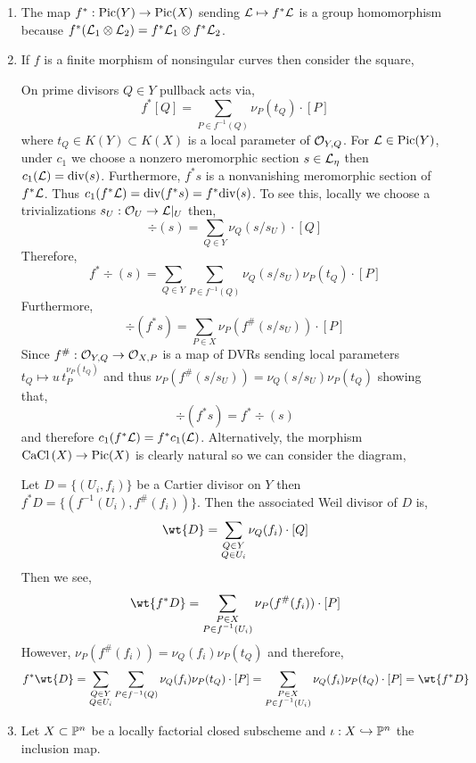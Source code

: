 \documentclass[12pt]{article}
\begin{document}
\begin{enumerate}
\item The map $f^* : \Pic{Y} \to \Pic{X}$ sending $\L \mapsto f^* \L$ is a group homomorphism because $f^* (\L_1 \otimes \L_2) = f^* \L_1 \otimes f^* \L_2$. 

\item If $f$ is a finite morphism of nonsingular curves then consider the square,
\begin{center}
\end{center}
On prime divisors $Q \in Y$ pullback acts via,
\[ f^* [Q] = \sum_{P \in f^{-1}(Q)} \nu_P(t_Q) \cdot [P] \]
where $t_Q \in K(Y) \subset K(X)$ is a local parameter of $\stalk{Y}{Q}$. For $\L \in \Pic{Y}$, under $c_1$ we choose a nonzero meromorphic section $s \in \L_\eta$ then $c_1(\L) = \div{(s)}$. Furthermore, $f^* s$ is a nonvanishing meromorphic section of $f^* \L$. Thus $c_1(f^* \L) = \div{(f^* s)} = f^* \div{(s)}$. To see this, locally we choose a trivializations $s_{U} : \struct{U} \to \L|_U$ then,
\[ \div{(s)} = \sum_{Q \in Y} \nu_Q(s/s_U) \cdot [Q] \] 
Therefore,
\[ f^* \div{(s)} = \sum_{Q \in Y} \sum_{P \in f^{-1}(Q)} \nu_Q(s/s_U) \nu_P(t_Q) \cdot [P] \]
Furthermore, 
\[ \div{(f^* s)} = \sum_{P \in X} \nu_P(f^\#(s/s_U)) \cdot [P] \]
Since $f^\# : \stalk{Y}{Q} \to \stalk{X}{P}$ is a map of DVRs sending local parameters $t_Q \mapsto u \, t_P^{\nu_P(t_Q)}$ and thus $\nu_P(f^\#(s/s_U)) = \nu_Q(s/s_U) \nu_P(t_Q)$ showing that,
\[ \div{(f^* s)} = f^* \div{(s)} \]
and therefore $c_1(f^* \L) = f^* c_1(\L)$. Alternatively, the morphism $\CaCl{X} \to \Pic{X}$ is clearly natural so we can consider the diagram,
\begin{center}
\end{center}
Let $D = \{(U_i, f_i)\}$ be a Cartier divisor on $Y$ then $f^*D = \{(f^{-1}(U_i), f^\#(f_i))\}$. Then the associated Weil divisor of $D$ is,
\[ \wt{D} = \sum_{\substack{Q \in Y \\ Q \in U_i}} \nu_Q(f_i) \cdot [Q] \]
Then we see,
\[ \wt{f^* D} = \sum_{\substack{P \in X \\ P \in f^{-1}(U_i)}} \nu_P(f^\#(f_i)) \cdot [P] \]
However, $\nu_P(f^\#(f_i)) = \nu_Q(f_i) \nu_P(t_Q)$ and therefore,
\[ f^* \wt{D} = \sum_{\substack{Q \in Y \\ Q \in U_i}} \sum_{P \in f^{-1}(Q)} \nu_Q(f_i) \nu_P(t_Q) \cdot [P] = \sum_{\substack{P \in X \\ P \in f^{-1}(U_i)}} \nu_Q(f_i) \nu_P(t_Q) \cdot [P] = \wt{f^* D} \]

\item Let $X \subset \P^n$ be a locally factorial closed subscheme and $\iota : X \embed \P^n$ the inclusion map. 
\end{enumerate}
\end{document}

